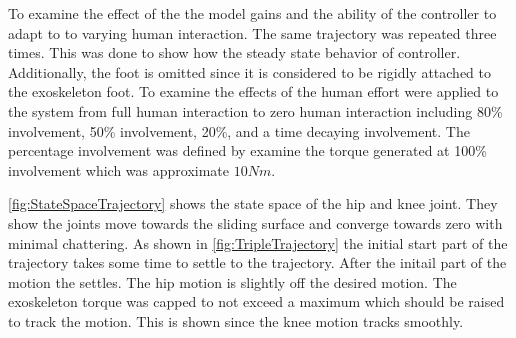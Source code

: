 To examine the effect of the the model gains and the ability of the controller to adapt to to varying human interaction. The same trajectory was repeated three times. This was done to show how the steady state behavior of controller. Additionally, the foot is omitted since it is considered to be rigidly attached to the exoskeleton foot. 
To examine the effects of the human effort were applied to the system from full human interaction to zero human interaction including 80\% involvement, 50\% involvement, 20\%, and a time decaying involvement. The percentage involvement was defined by examine the torque generated at 100\% involvement which was approximate $10Nm$. 

\autoref{fig:StateSpaceTrajectory} shows the state space of the hip and knee joint. They show the joints move towards the sliding surface and converge towards zero with minimal chattering.  As shown in \autoref{fig:TripleTrajectory} the initial start part of the trajectory takes some time to settle to the trajectory. After the initail part of the motion the settles. The hip motion is slightly off the desired motion. The exoskeleton torque was capped to not exceed a maximum which should be raised to track the motion. This is shown since the knee motion tracks smoothly. 




